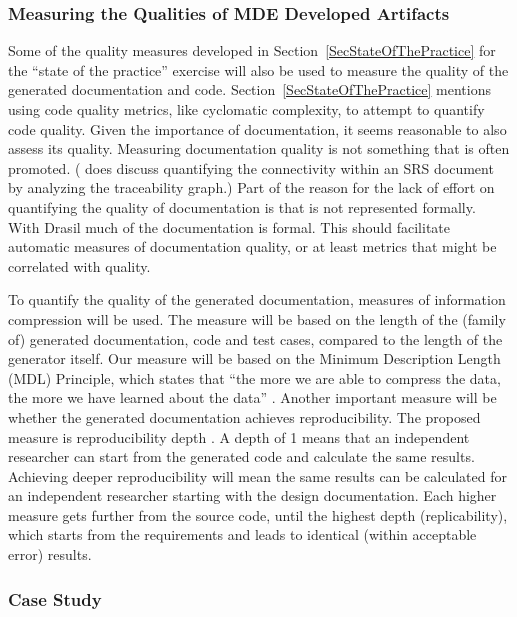 \documentclass[12pt]{article}
\begin{document}
\subsubsection{Measuring the Qualities of MDE Developed
  Artifacts} \label{SecQOfMDEArtifacts}

Some of the quality measures developed in Section~\ref{SecStateOfThePractice}
for the ``state of the practice'' exercise will also be used to measure the
quality of the generated documentation and code.
Section~\ref{SecStateOfThePractice} mentions using code quality metrics, like
cyclomatic complexity, to attempt to quantify code quality.  Given the
importance of documentation, it seems reasonable to also assess its quality.
Measuring documentation quality is not something that is often promoted.
(\citet{Sanga2003} does discuss quantifying the connectivity within an SRS
document by analyzing the traceability graph.)  Part of the reason for the lack
of effort on quantifying the quality of documentation is that is not represented
formally.  With Drasil much of the documentation is formal.  This should
facilitate automatic measures of documentation quality, or at least metrics that
might be correlated with quality.

To quantify the quality of the generated documentation, measures of information
compression will be used.  The measure will be based on the length of the
(family of) generated documentation, code and test cases, compared to the length
of the generator itself.  Our measure will be based on the Minimum Description
Length (MDL) Principle, which states that ``the more we are able to compress the
data, the more we have learned about the data'' \citep{Grunwald2004}.  Another
important measure will be whether the generated documentation achieves
reproducibility. The proposed measure is reproducibility depth
\citep{Soergel2014}.  A depth of 1 means that an independent researcher can
start from the generated code and calculate the same results.  Achieving deeper
reproducibility will mean the same results can be calculated for an independent
researcher starting with the design documentation.  Each higher measure gets
further from the source code, until the highest depth (replicability), which
starts from the requirements and leads to identical (within acceptable error)
results.

\subsubsection{Case Study} \label{SecCaseStudy}
\end{document}
